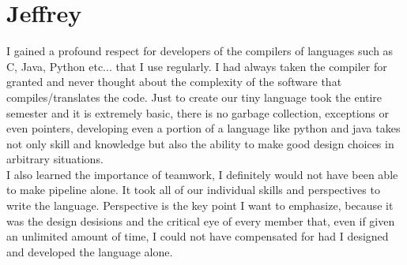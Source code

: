 \documentclass[./Report_main.tex]{subfiles}
\begin{document}
\section{Jeffrey}
I gained a profound respect for developers of the compilers of languages such as C, Java, Python etc... that I use regularly. I had always taken the compiler for granted and never thought about the complexity of the software that compiles/translates the code. Just to create our tiny language took the entire semester and it is extremely basic, there is no garbage collection, exceptions or even pointers, developing even a portion of a language like python and java takes not only skill and knowledge but also the ability to make good design choices in arbitrary situations. \\
I also learned the importance of teamwork, I definitely would not have been able to make pipeline alone. It took all of our individual skills and perspectives to write the language. Perspective is the key point I want to emphasize, because it was the design desisions and the critical eye of every member that, even if given an unlimited amount of time, I could not have compensated for had I designed and developed the language alone.
\end{document}
